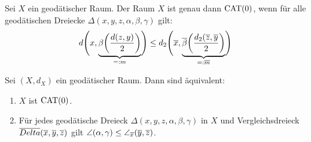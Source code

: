 \begin{lemma}
\label{lemma:2.45}
	Sei $X$ ein geodätischer Raum. 
	Der Raum $X$ ist genau dann $\operatorname{CAT(0)}$, wenn für alle geodätischen Dreiecke $\Delta(x,y,z,\alpha,\beta,\gamma)$ gilt: 
	\[
		d\enbrace[\Bigg]{x,\underbrace{\beta \enbrace*{\frac{d(z,y)}{2}}}_{=:m}} \leq d_2\enbrace[\Bigg]{\ol{x}, \underbrace{\ol{\beta} \enbrace*{\frac{d_2(\ol{z},\ol{y}}{2}}}_{=:\ol{m}}}
	\]
\end{lemma}

\begin{satz}
\label{satz:2.46}
	Sei $(X,d_X)$ ein geodätischer Raum.
	Dann sind äquivalent:
	\begin{enumerate}
		\item $X$ ist $\operatorname{CAT(0)}$.
		\item Für jedes geodätische Dreieck $\Delta(x,y,z,\alpha,\beta,\gamma)$ in $X$ und Vergleichsdreieck $\overline{Delta}(\overline{x},\overline{y},\overline{z})$ gilt $\angle(\alpha,\gamma) \leq \angle_{\overline{x}}(\overline{y},\overline{z})$.
	\end{enumerate}
\end{satz}

